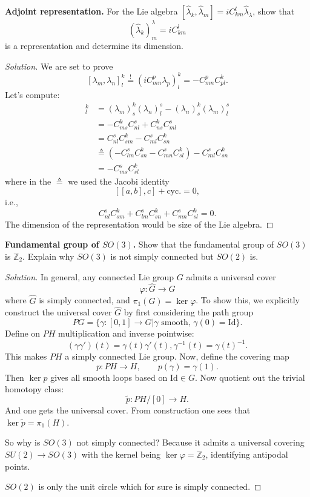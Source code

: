 \textbf{Adjoint representation.} For the Lie algebra $[\hat{\lambda} _k, \hat{\lambda} _m] = i C_{k m}^l \hat{\lambda} _\lambda$, show that 
 \[
	 (\hat{\lambda} _k)^\lambda_m = i C_{k m}^l
\] 
is a representation and determine its dimension.

\begin{proof}[Solution]
	We are set to prove
	\[
		[\lambda_m, \lambda_n]^k_l
		\stackrel!= (i C_{m n} ^p \lambda_p)^k _l 
		= - C _{m n}^p C_{p l}^k
	.\] 
	Let's compute:
	\begin{align*}
		[\lambda_m, \lambda_n]^k_l
		&= (\lambda_m)^k_s (\lambda_n)^s_l - (\lambda_n)^k_s (\lambda_m)^s_l \\
		&= - C_{m s}^k C_{n l}^s + C_{n s}^k C_{m l}^s \\
		&= C_{n l}^s C_{s m}^k - C_{m l}^s C_{s n}^k \\
		&\triangleq (- C_{l m}^s C_{s n}^k - C_{m n}^s C_{s l}^k) - C_{m l}^s C_{s n}^k \\
		&= - C_{m s}^s C_{s l}^k
	\end{align*}
	where in the $\triangleq$ we used the Jacobi identity
	\[
		\left[ [a,b] , c \right]  + \text{cyc.} = 0
	,\] 
	i.e.,
	\[
		C_{n l}^s C_{s m}^k + C_{l m} ^s C_{s n}^k + C_{m n}^s C_{s l}^k = 0
	.\] 
	The dimension of the representation would be size of the Lie algebra.
\end{proof}

\textbf{Fundamental group of $SO(3)$.} Show that the fundamental group of $SO(3)$ is $\mathbb{Z}_2$. Explain why $SO(3)$ is not simply connected but $SO(2) $ is.

\begin{proof}[Solution]
	In general, any connected Lie group $G$ admits a universal cover
	\[
		\varphi: \hat{G}  \to  G
	\] 
	where $\hat{G} $ is simply connected, and $\pi_1(G) = \operatorname{ker} \varphi$. To show this, we explicitly construct the universal cover $\hat{G} $ by first considering the path group
	\[
		PG = \{\gamma: [0,1] \to G | \gamma \text{ smooth, }\gamma(0) = \text{Id}\} 
	.\] 
	Define on $PH$ multiplication and inverse pointwise:
	\[
		(\gamma \gamma')(t) = \gamma(t) \gamma'(t),
		\gamma^{-1}(t) = \gamma(t)^{-1}
	.\] 
	This makes $PH$ a simply connected Lie group. Now, define the covering map
	\[
		p: PH \to  H, \qquad p(\gamma) = \gamma(1)
	.\] 
	Then $\operatorname{ker} p$ gives all smooth loops based on $\text{Id} \in G$. Now quotient out the trivial homotopy class:
	\[
		\tilde p : P H / [0] \to  H
	.\] 
	And one gets the universal cover. From construction one sees that $\operatorname{ker} \tilde p = \pi_1(H)$.

	So why is $SO(3)$ not simply connected? Because it admits a universal covering $SU(2) \to SO(3)$ with the kernel being $\operatorname{ker} \varphi = \mathbb{Z}_2$, identifying antipodal points.

	$SO(2)$ is only the unit circle which for sure is simply connected.
\end{proof}





